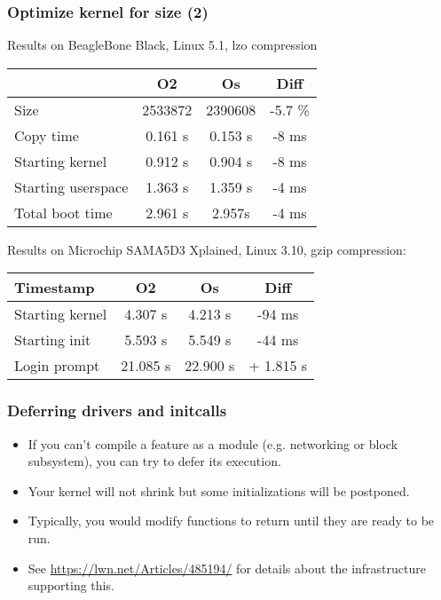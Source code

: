 \begin{frame}
\frametitle{Optimize kernel for size (2)}
Results on BeagleBone Black, Linux 5.1, lzo compression
\begin{tabular}{| l || c | c | c |}
\hline
& O2 & Os & Diff \\
\hline
Size & 2533872 & 2390608 & -5.7 \% \\
Copy time &  0.161 s & 0.153 s & -8 ms \\
Starting kernel & 0.912 s & 0.904 s & -8 ms \\
Starting userspace & 1.363 s & 1.359 s & -4 ms \\
Total boot time & 2.961 s & 2.957s & -4 ms \\
\hline
\end{tabular}
\newline\newline
Results on Microchip SAMA5D3 Xplained, Linux 3.10, gzip compression:
\begin{tabular}{| l || c | c | c |}
\hline
Timestamp & O2 & Os & Diff \\
\hline
Starting kernel & 4.307 s & 4.213 s & -94 ms \\
Starting init & 5.593 s & 5.549 s & -44 ms \\
Login prompt & 21.085 s & 22.900 s & + 1.815 s \\
\hline
\end{tabular}
\newline\newline
\end{frame}

\begin{frame}
\frametitle{Deferring drivers and initcalls}
\begin{itemize}
\item If you can't compile a feature as a module (e.g. networking or block
      subsystem), you can try to defer its execution.
\item Your kernel will not shrink but some initializations will be
      postponed.
\item Typically, you would modify  functions to return
      \code{-} until they are ready to be run.
\item See \url{https://lwn.net/Articles/485194/} for details about the
      infrastructure supporting this.
\end{itemize}
\end{frame}

